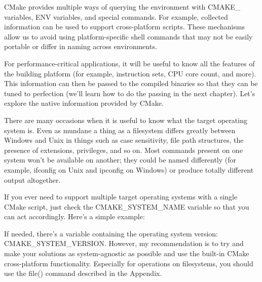 CMake provides multiple ways of querying the environment with CMAKE\_ variables, ENV variables, and special commands. For example, collected information can be used to support cross-platform scripts. These mechanisms allow us to avoid using platform-specific shell commands that may not be easily portable or differ in naming across environments.

For performance-critical applications, it will be useful to know all the features of the building platform (for example, instruction sets, CPU core count, and more). This information can then be passed to the compiled binaries so that they can be tuned to perfection (we’ll learn how to do the passing in the next chapter). Let’s explore the native information provided by CMake.


There are many occasions when it is useful to know what the target operating system is. Even as mundane a thing as a filesystem differs greatly between Windows and Unix in things such as case sensitivity, file path structures, the presence of extensions, privileges, and so on. Most commands present on one system won’t be available on another; they could be named differently (for example, ifconfig on Unix and ipconfig on Windows) or produce totally different output altogether.

If you ever need to support multiple target operating systems with a single CMake script, just check the CMAKE\_SYSTEM\_NAME variable so that you can act accordingly. Here’s a simple example:


If needed, there’s a variable containing the operating system version: CMAKE\_SYSTEM\_VERSION. However, my recommendation is to try and make your solutions as system-agnostic as possible and use the built-in CMake cross-platform functionality. Especially for operations on filesystems, you should use the file() command described in the Appendix.

